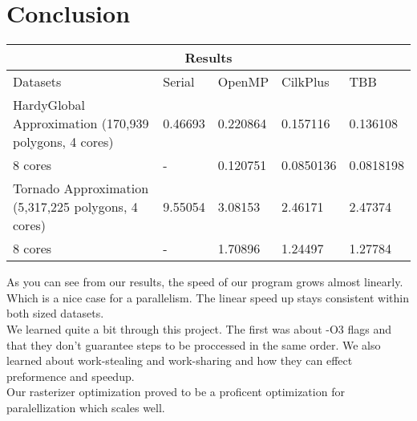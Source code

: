 \chapter*{Conclusion}


\begin{tabular}{ |p{5cm}|p{2cm}|p{2cm}|p{2cm}|p{2cm}|  }
 \hline
 \multicolumn{5}{|c|}{Results} \\
 \hline
 Datasets & Serial & OpenMP & CilkPlus & TBB\\
 \hline
 HardyGlobal Approximation (170,939 polygons, 4 cores) & 0.46693 & 0.220864 & 0.157116 & 0.136108\\
 8 cores & - & 0.120751 & 0.0850136 & 0.0818198\\
 \hline
 Tornado Approximation (5,317,225 polygons, 4 cores) & 9.55054 & 3.08153 & 2.46171 & 2.47374\\
 8 cores & - & 1.70896 & 1.24497 & 1.27784\\
 \hline
\end{tabular}

\vspace{10mm}
As you can see from our results, the speed of our program grows almost linearly. Which is a nice case for a parallelism. The linear speed up stays consistent within both sized datasets.\\

We learned quite a bit through this project. The first was about -O3 flags and that they don't guarantee steps to be proccessed in the same order. We also learned about work-stealing and work-sharing and how they can effect preformence and speedup.\\

Our rasterizer optimization proved to be a proficent optimization for paralellization which scales well. 

